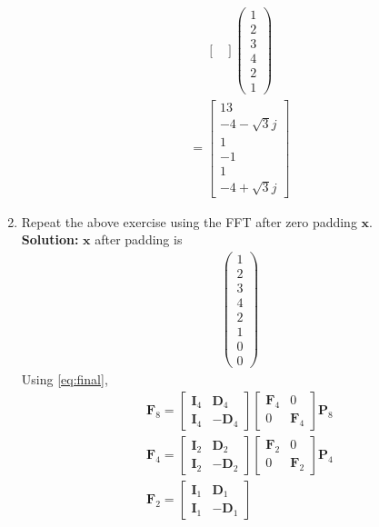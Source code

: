 \documentclass[journal,12pt,twocolumn]{IEEEtran}
\newcommand{\solution}{\noindent \textbf{Solution: }}
\let\vec\mathbf
\numberwithin{equation}{section}
\renewcommand\thesection{\arabic{section}}
\newcommand{\myvec}[1]{\ensuremath{\begin{pmatrix}#1\end{pmatrix}}}
\begin{document}
\begin{enumerate}[label=\arabic*.,ref=\thesection.\theenumi]
\begin{align}
\begin{bmatrix}
\end{bmatrix} \myvec{1\\2\\3\\4\\2\\1}
\end{align}
\begin{align}
=\begin{bmatrix}
13\\-4-\sqrt{3}j\\1\\-1\\1\\-4+\sqrt{3}j
\end{bmatrix}
\end{align}
    \item Repeat the above exercise using the FFT
	    after zero padding $\vec{x}$.\\
\solution $\vec{x}$ after padding is 
\begin{align}
\myvec{1\\2\\3\\4\\2\\1\\0\\0}
\end{align}
Using \eqref{eq:final},
\begin{align}
\vec{F}_{8}=
\begin{bmatrix}
\vec{I}_{4} & \vec{D}_{4} \\
\vec{I}_{4} & -\vec{D}_{4}
\end{bmatrix}
\begin{bmatrix}
\vec{F}_{4} & 0 \\
0 & \vec{F}_{4}
\end{bmatrix}
\vec{P}_{8}\\
\vec{F}_{4}=
\begin{bmatrix}
\vec{I}_{2} & \vec{D}_{2} \\
\vec{I}_{2} & -\vec{D}_{2}
\end{bmatrix}
\begin{bmatrix}
\vec{F}_{2} & 0 \\
0 & \vec{F}_{2}
\end{bmatrix}
\vec{P}_{4}\\
\vec{F}_{2}=
\begin{bmatrix}
\vec{I}_{1} & \vec{D}_{1} \\
\vec{I}_{1} & -\vec{D}_{1}
\end{bmatrix}

\end{align}
\end{enumerate}
\end{document}
